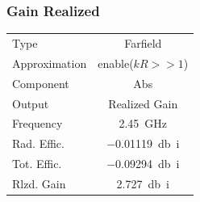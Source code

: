 \documentclass[Deriaz_Traiber_Labo02]{subfiles}
\begin{document}
\subsubsection{Gain Realized}

\begin{table}[H]
\centering
\begin{tabular}{l c}\hline
Type				& Farfield\\
Approximation	& enable($kR>>1$)\\
Component		& Abs\\
Output			& Realized Gain\\
Frequency		& \SI{2.45}{\giga\hertz}\\
Rad. Effic.		& \SI{-0.01119}{\decibel i}\\
Tot. Effic.		& \SI{-0.09294}{\decibel i}\\
Rlzd. Gain	 	& \SI{2.727}{\decibel i}\\\hline
\end{tabular}
\end{table}
\end{document}
